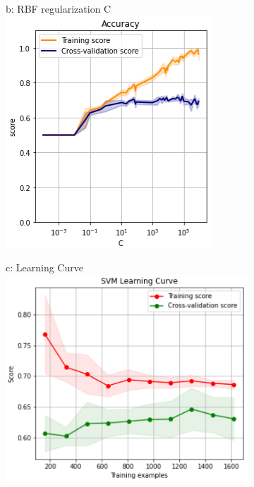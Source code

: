 \documentclass{article}
\begin{document}
\begin{figure}
\begin{subfigure}{.30\textwidth}
	\end{subfigure}
	\begin{subfigure}{.30\textwidth}
		\centering
		b: RBF regularization C\\
		\includegraphics[width=\linewidth]{poland_svm_rbf_c_accuracy.png}
		
	\end{subfigure}
	\begin{subfigure}{.38\textwidth}
		\centering
		c: Learning Curve\\
		\includegraphics[width=\linewidth]{poland_svm_learning.png}
		
	\end{subfigure}
	\label{fig:test}
\end{figure}					
\end{document}
